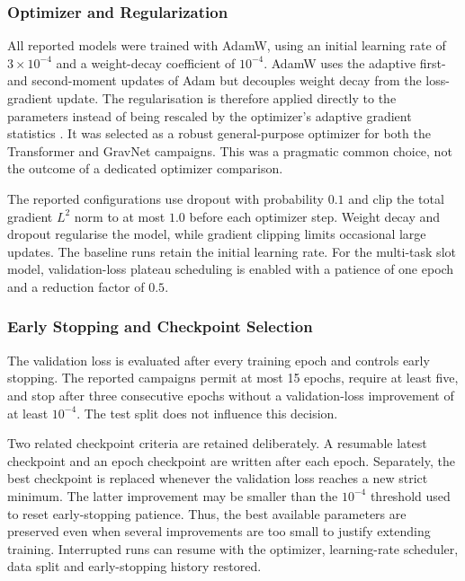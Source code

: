 \subsubsection{Optimizer and Regularization}

All reported models were trained with AdamW, using an initial learning rate of
\(3\times10^{-4}\) and a weight-decay coefficient of \(10^{-4}\). AdamW uses
the adaptive first- and second-moment updates of Adam but decouples weight
decay from the loss-gradient update. The regularisation is therefore applied
directly to the parameters instead of being rescaled by the optimizer's
adaptive gradient statistics \cite{loshchilov2019-adamw}. It was selected as a
robust general-purpose optimizer for both the Transformer and GravNet
campaigns. This was a pragmatic common choice, not the outcome of a dedicated
optimizer comparison.

The reported configurations use dropout with probability \(0.1\) and clip the
total gradient \(L^2\) norm to at most \(1.0\) before each optimizer step.
Weight decay and dropout regularise the model, while gradient clipping limits
occasional large updates. The baseline runs retain the initial learning rate.
For the multi-task slot model, validation-loss plateau scheduling is enabled
with a patience of one epoch and a reduction factor of \(0.5\).

\subsubsection{Early Stopping and Checkpoint Selection}

The validation loss is evaluated after every training epoch and controls early
stopping. The reported campaigns permit at most 15 epochs, require at least
five, and stop after three consecutive epochs without a validation-loss
improvement of at least \(10^{-4}\). The test split does not influence this
decision.

Two related checkpoint criteria are retained deliberately. A resumable latest
checkpoint and an epoch checkpoint are written after each epoch. Separately,
the best checkpoint is replaced whenever the validation loss reaches a new
strict minimum. The latter improvement may be smaller than the \(10^{-4}\)
threshold used to reset early-stopping patience. Thus, the best available
parameters are preserved even when several improvements are too small to
justify extending training. Interrupted runs can resume with the optimizer,
learning-rate scheduler, data split and early-stopping history restored.

